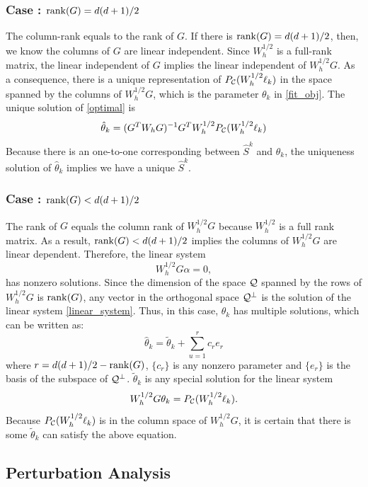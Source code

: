 \documentclass[aos,preprint]{imsart}
\theoremstyle{remark}
\begin{document}
\subsubsection*{Case : ${\rm rank}(G)={d(d+1)}/{2}$ } 
The column-rank equals to the rank of $G$. If there is ${\rm rank}(G)={d(d+1)}/{2}$, then, we know the columns of $G$ are linear independent. Since $W^{1/2}_h$ is a full-rank matrix, the linear independent of $G$ implies the linear independent of $W^{1/2}_hG$. As a consequence,  there is a unique representation of $P_{\cal C} (W_h^{1/2}\ell_k)$ in the space spanned by the columns of $W_h^{1/2} G$, which is the parameter $\theta_k$ in \eqref{fit_obj}. The unique solution of \eqref{optimal} is
\begin{equation}\label{solution}
\hat{\theta}_k = (G^TW_hG)^{-1} G^T W_h^{1/2} P_{\cal C} (W_h^{1/2}\ell_k)
\end{equation}
Because there is an one-to-one corresponding between $\hat{S}^k$ and $\hat{\theta}_k$, the uniqueness solution of $\hat{\theta}_k$ implies we have a unique $\hat{S}^k$.
\subsubsection*{Case : ${\rm rank}(G)<{d(d+1)}/{2}$ } 
 The rank of $G$ equals the column rank of $W_h^{1/2}G$ because $W_h^{1/2}$ is a full rank matrix.  As a result, ${\rm rank}(G)<{d(d+1)}/{2}$ implies the columns of $W_h^{1/2}G$ are linear dependent. Therefore, the linear system 
 \begin{equation}\label{linear_system}
 W_h^{1/2}G \alpha = 0,
 \end{equation}
 has nonzero solutions. Since the dimension of the space $\cal Q$ spanned by the rows of $W_h^{1/2}G$ is ${\rm rank}(G)$, any vector in the orthogonal space  ${\cal Q}^{\perp}$ is the solution of the linear system \eqref{linear_system}. Thus, in this case, $\hat{\theta}_k$ has multiple solutions, which can be written as:
 \[
 \hat{\theta}_k =  \tilde{\theta}_k + \sum_{u=1}^{r} c_r e_r
 \]
 where $r = {d(d+1)}/{2}-{\rm rank}(G)$, $\{c_r\}$ is any nonzero parameter and $\{e_r\}$ is the basis of the subspace of ${\cal Q}^{\perp}$. $\tilde{\theta}_k$ is any special solution for the linear system
 \[
 W_h^{1/2}G \theta_k  = P_{\cal C} (W_h^{1/2}\ell_k).
 \]
 Because $P_{\cal C} (W_h^{1/2}\ell_k)$ is in the column space of $W_h^{1/2}G$, it is certain that there is some $\tilde{\theta}_k$ can satisfy the above equation.
 \subsection{Perturbation Analysis}
\end{document}
